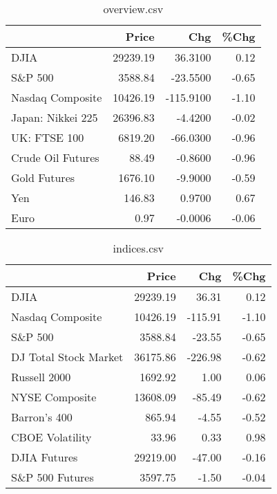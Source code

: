 \documentclass{article}%
\begin{document}
\begin{table}[htbp]%
\caption{overview.csv}%
\centering%
\begin{adjustbox}{width=1\textwidth}%
\begin{tabular}{lrrr}
\toprule
                  &    Price &       Chg &  \%Chg \\
\midrule
             DJIA & 29239.19 &   36.3100 &  0.12 \\
          S\&P 500 &  3588.84 &  -23.5500 & -0.65 \\
 Nasdaq Composite & 10426.19 & -115.9100 & -1.10 \\
Japan: Nikkei 225 & 26396.83 &   -4.4200 & -0.02 \\
     UK: FTSE 100 &  6819.20 &  -66.0300 & -0.96 \\
Crude Oil Futures &    88.49 &   -0.8600 & -0.96 \\
     Gold Futures &  1676.10 &   -9.9000 & -0.59 \\
              Yen &   146.83 &    0.9700 &  0.67 \\
             Euro &     0.97 &   -0.0006 & -0.06 \\
\bottomrule
\end{tabular}
%
\end{adjustbox}%
\end{table}

%


\begin{table}[htbp]%
\caption{indices.csv}%
\centering%
\begin{adjustbox}{width=1\textwidth}%
\begin{tabular}{lrrr}
\toprule
                      &    Price &     Chg &  \%Chg \\
\midrule
                 DJIA & 29239.19 &   36.31 &  0.12 \\
     Nasdaq Composite & 10426.19 & -115.91 & -1.10 \\
              S\&P 500 &  3588.84 &  -23.55 & -0.65 \\
DJ Total Stock Market & 36175.86 & -226.98 & -0.62 \\
         Russell 2000 &  1692.92 &    1.00 &  0.06 \\
       NYSE Composite & 13608.09 &  -85.49 & -0.62 \\
         Barron's 400 &   865.94 &   -4.55 & -0.52 \\
      CBOE Volatility &    33.96 &    0.33 &  0.98 \\
         DJIA Futures & 29219.00 &  -47.00 & -0.16 \\
      S\&P 500 Futures &  3597.75 &   -1.50 & -0.04 \\
\bottomrule
\end{tabular}
%
\end{adjustbox}%
\end{table}
\end{document}
